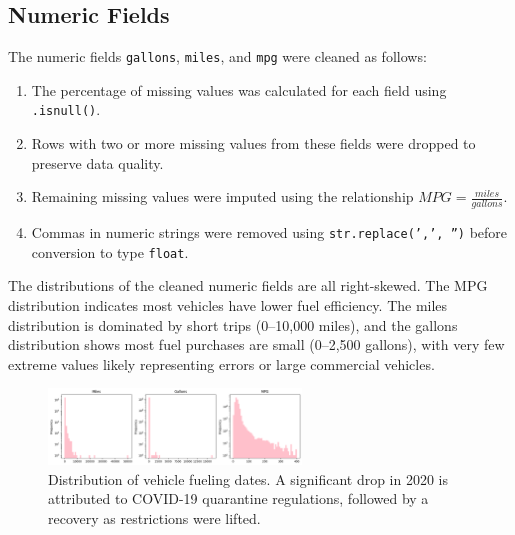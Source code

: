 \documentclass{article}
\begin{document}
\subsection{Numeric Fields}
The numeric fields \texttt{gallons}, \texttt{miles}, and \texttt{mpg} were cleaned as follows:
\begin{enumerate}
    \item The percentage of missing values was calculated for each field using \texttt{.isnull()}.
    \item Rows with two or more missing values from these fields were dropped to preserve data quality.
    \item Remaining missing values were imputed using the relationship $MPG = \frac{miles}{gallons}$.
    \item Commas in numeric strings were removed using \texttt{str.replace(',', '')} before conversion to type \texttt{float}.
\end{enumerate}

The distributions of the cleaned numeric fields are all right-skewed. The MPG distribution indicates most vehicles have lower fuel efficiency. The miles distribution is dominated by short trips (0--10,000 miles), and the gallons distribution shows most fuel purchases are small (0--2,500 gallons), with very few extreme values likely representing errors or large commercial vehicles.

\begin{figure}[htbp]
    \centering
    \includegraphics[width=0.6\textwidth]{images/numeric_distributions.png}
    \caption{Distribution of vehicle fueling dates. A significant drop in 2020 is attributed to COVID-19 quarantine regulations, followed by a recovery as restrictions were lifted.}
    \label{fig:fuel_dates}
\end{figure}
\end{document}
